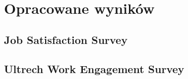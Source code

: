 \section{Opracowane wyników}
\subsection{Job Satisfaction Survey}

\subsection{Ultrech Work Engagement Survey}
